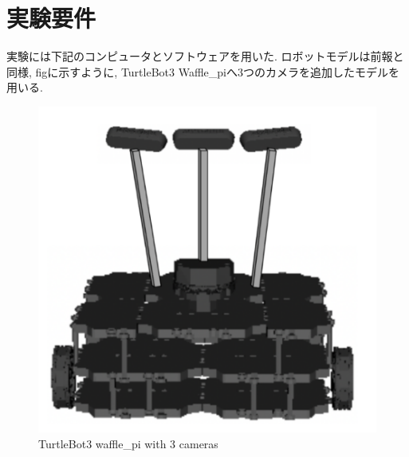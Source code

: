 
\section{実験要件}
実験には下記のコンピュータとソフトウェアを用いた. ロボットモデルは前報\cite{okada1}\cite{okada2}と同様, figに示すように, TurtleBot3 Waffle\_piへ3つのカメラを追加したモデルを用いる.

\begin{figure}[hbtp]
  \centering
 \includegraphics[keepaspectratio, scale=0.3]
      {images/Waffle_pi.png}
 \caption{TurtleBot3 waffle\_pi with 3 cameras}
 \label{Fig:waffle_pi}
\end{figure}


